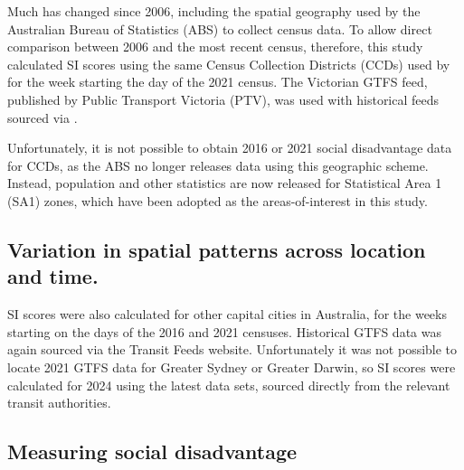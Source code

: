\documentclass[preprint, 3p,
authoryear]{elsarticle} %
\begin{document}
Much has changed since 2006, including the spatial geography used by the
Australian Bureau of Statistics (ABS) to collect census data. To allow
direct comparison between 2006 and the most recent census, therefore,
this study calculated SI scores using the same Census Collection
Districts (CCDs) used by \citet{currie2010identifying} for the week
starting the day of the 2021 census. The Victorian GTFS feed, published
by Public Transport Victoria (PTV), was used with historical feeds
sourced via \citet{transitfeeds_victoria:2023aa}.

Unfortunately, it is not possible to obtain 2016 or 2021 social
disadvantage data for CCDs, as the ABS no longer releases data using
this geographic scheme. Instead, population and other statistics are now
released for Statistical Area 1 (SA1) zones, which have been adopted as
the areas-of-interest in this study.

\hypertarget{variation-in-spatial-patterns-across-location-and-time.}{%
\subsection{Variation in spatial patterns across location and
time.}\label{variation-in-spatial-patterns-across-location-and-time.}}

SI scores were also calculated for other capital cities in Australia,
for the weeks starting on the days of the 2016 and 2021 censuses.
Historical GTFS data was again sourced via the Transit Feeds website.
Unfortunately it was not possible to locate 2021 GTFS data for Greater
Sydney or Greater Darwin, so SI scores were calculated for 2024 using
the latest data sets, sourced directly from the relevant transit
authorities.

\hypertarget{measuring-social-disadvantage}{%
\subsection{Measuring social
disadvantage}\label{measuring-social-disadvantage}}
\end{document}
